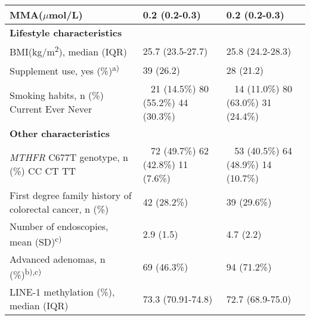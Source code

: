 \begin{table}
\begin{adjustbox}{width=\textwidth}
\begin{tabular}{C{5.5cm}C{3.5cm}C{3cm}}
\hline
{MMA(}\textrm{${\mu}$}{mol/L)} & 0.2 (0.2-0.3) & {0.2 (0.2-0.3})\\
\hline
\bfseries Lifestyle characteristics & ~ & ~ \\
\hline
{BMI(kg/m}{\textsuperscript{2}}{), median (IQR)} & 25.7 (23.5-27.7) & 25.8 (24.2-28.3)\\
\hline
 Supplement use, yes (\%)\textsuperscript{a)} & 39 (26.2) & 28 (21.2)\\
\hline
{ Smoking habits, n (\%)}{ Current}{ Ever} Never & ~ { 21 (14.5\%)}{ 80 (55.2\%)} 44 (30.3\%) & ~ { 14 (11.0\%)}{ 80 (63.0\%)} 31 (24.4\%)\\
\hline
\bfseries Other characteristics & ~ & ~ \\
\hline
{\textit{MTHFR}}{ C677T genotype, n (\%)}{ CC}{ CT} TT & ~ { 72 (49.7\%)}{ 62 (42.8\%)} 11 (7.6\%) & ~ { 53 (40.5\%)}{ 64 (48.9\%)} 14 (10.7\%)\\
\hline
 First degree family history of colorectal cancer, n (\%) & 42 (28.2\%) & 39 (29.6\%)\\
\hline
 Number of endoscopies, mean (SD)\textsuperscript{c)} & 2.9 (1.5) & 4.7 (2.2)\\
\hline
 Advanced adenomas, n
(\%)\textsuperscript{b),c)} & 69 (46.3\%) & 94 (71.2\%)\\
\hline
 LINE-1 methylation (\%), median (IQR) & 73.3 (70.91-74.8) & 72.7 (68.9-75.0)\\
\hline
\end{tabular}
\end{adjustbox}
\end{table}

